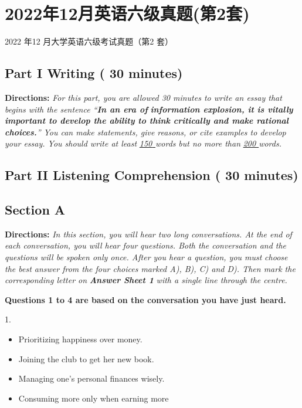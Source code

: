 \documentclass[UTF8,11pt]{ctexart}
\begin{document}
\section*{2022年12月英语六级真题(第2套)}
2022 年12 月大学英语六级考试真题（第2 套）


\subsection*{\textbf{Part I Writing} \textbf{( 30 minutes)}}


\textbf{Directions:}\textit{ For this part, you are allowed 30 minutes to write an essay that begins with the sentence “}\textbf{\textit{In an era of}} \textbf{\textit{information explosion, it is vitally important to develop the ability to think critically and make rational choices.}}\textit{”} \textit{You can make statements, give reasons, or cite examples to develop your essay. You should write at least }\textit{\uline{150}}\textbf{\textit{\uline{ }}}\textit{words} \textit{but no more than }\textit{\uline{200 }}\textit{words.}


\subsection*{\textbf{Part II} \textbf{Listening Comprehension} \textbf{( 30 minutes)}}


\subsection*{\textbf{Section A}}


\textbf{Directions:} \textit{In this section, you will hear two long conversations. At the end of each conversation, you will hear four} \textit{questions. Both the conversation and the questions will be spoken only once. After you hear a question, you must} \textit{choose the best answer from the four choices marked A), B), C) and D). Then mark the corresponding letter on} \textbf{\textit{Answer Sheet 1}}\textit{ with a single line through the centre.}


\textbf{Questions 1 to 4 are based on the conversation you have just heard.}


1.


\begin{itemize}[leftmargin=2em,itemsep=.2em,topsep=.4em]\item[A.] Prioritizing happiness over money.
\item[B.] Joining the club to get her new book.
\item[C.] Managing one’s personal finances wisely.
\item[D.] Consuming more only when earning more
\end{itemize}
\end{document}
